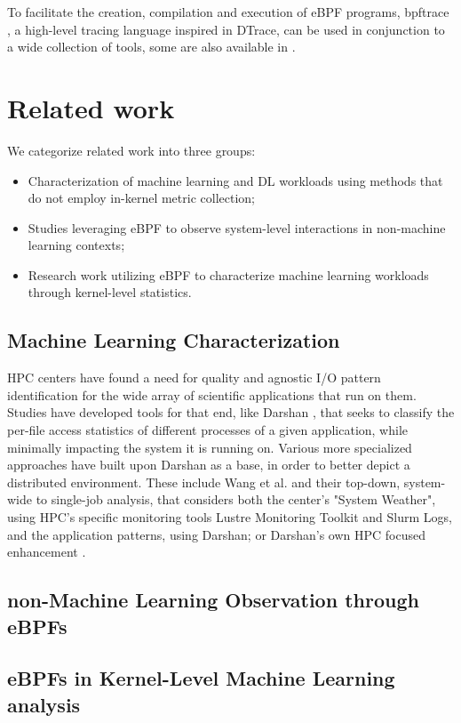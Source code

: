 \documentclass[conference]{IEEEtran}
\begin{document}
To facilitate the creation, compilation and execution of eBPF programs, bpftrace \cite{bpftrace}, a high-level tracing language inspired in DTrace, can be used in conjunction to a wide collection of tools, some are also available in \cite{bgreggBook}.

\section{Related work}

We categorize related work into three groups:
\begin{itemize}
	\item Characterization of machine learning and DL workloads using methods that do not employ in-kernel metric collection;
	\item Studies leveraging eBPF to observe system-level interactions in non-machine learning contexts;
	\item Research work utilizing eBPF to characterize machine learning workloads through kernel-level statistics.
\end{itemize}

\subsection{Machine Learning Characterization}

HPC centers have found a need for quality and agnostic I/O pattern identification for the wide array of scientific applications that run on them. Studies have developed tools for that end, like Darshan \cite{HPCIO24/7}, that seeks to classify the per-file access statistics of different processes of a given application, while minimally impacting the system it is running on. Various more specialized approaches have built upon Darshan as a base, in order to better depict a distributed environment. These include Wang et al. \cite{zoomin} and their top-down, system-wide to single-job analysis, that considers both the center's "System Weather", using HPC's specific monitoring tools Lustre Monitoring Toolkit and Slurm Logs, and the application patterns, using Darshan; or Darshan's own HPC focused enhancement \cite{HPCIODarshan}.

\subsection{non-Machine Learning Observation through eBPFs}

\subsection{eBPFs in Kernel-Level Machine Learning analysis}
\end{document}
